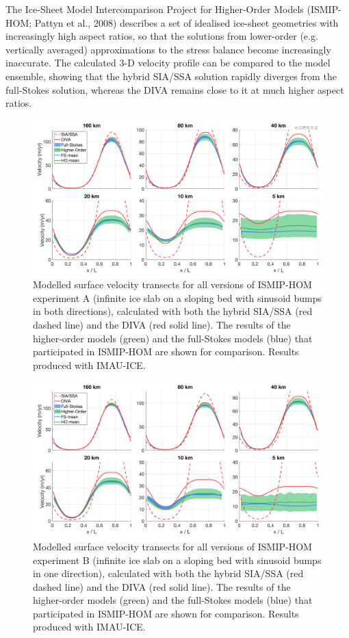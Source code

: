 \documentclass{article}
\begin{document}
The Ice-Sheet Model Intercomparison Project for Higher-Order Models (ISMIP-HOM; Pattyn et al., 2008) describes a set of idealised ice-sheet geometries with increasingly high aspect ratios, so that the solutions from lower-order (e.g. vertically averaged) approximations to the stress balance become increasingly inaccurate. The calculated 3-D velocity profile can be compared to the model ensemble, showing that the hybrid SIA/SSA solution rapidly diverges from the full-Stokes solution, whereas the DIVA remains close to it at much higher aspect ratios.

\begin{figure}[H]
  \includegraphics[width=0.95\linewidth]{Fig_benchmark_ISMIP_HOM_A.png}
  \caption{Modelled surface velocity transects for all versions of ISMIP-HOM experiment A (infinite ice slab on a sloping bed with sinusoid bumps in both directions), calculated with both the hybrid SIA/SSA (red dashed line) and the DIVA (red solid line). The results of the higher-order models (green) and the full-Stokes models (blue) that participated in ISMIP-HOM are shown for comparison. Results produced with IMAU-ICE.}
\end{figure}

\begin{figure}[H]
  \includegraphics[width=0.95\linewidth]{Fig_benchmark_ISMIP_HOM_B.png}
  \caption{Modelled surface velocity transects for all versions of ISMIP-HOM experiment B (infinite ice slab on a sloping bed with sinusoid bumps in one direction), calculated with both the hybrid SIA/SSA (red dashed line) and the DIVA (red solid line). The results of the higher-order models (green) and the full-Stokes models (blue) that participated in ISMIP-HOM are shown for comparison. Results produced with IMAU-ICE.}
\end{figure}
\end{document}
